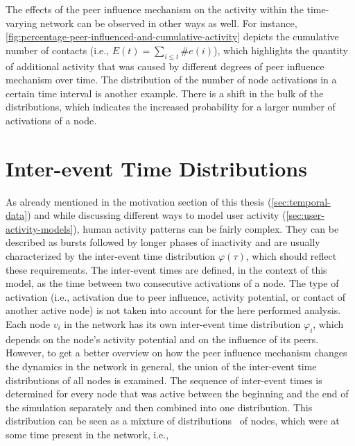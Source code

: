The effects of the peer influence mechanism on the activity within the time-varying network can be observed in other ways as well.
For instance, \cref{fig:percentage-peer-influenced-and-cumulative-activity} depicts the cumulative number of contacts (i.e., \( E(t) = \sum_{i \leq t} \#e(i) \)), which highlights the quantity of additional activity that was caused by different degrees of peer influence mechanism over time.
The distribution of the number of node activations in a certain time interval is another example.
There is a shift in the bulk of the distributions, which indicates the increased probability for a larger number of activations of a node.




\section{Inter-event Time Distributions}
\label{sec:inter-event-time-dists}

As already mentioned in the motivation section of this thesis (\cref{sec:temporal-data}) and while discussing different ways to model user activity (\cref{sec:user-activity-models}), human activity patterns can be fairly complex.
They can be described as bursts followed by longer phases of inactivity and are usually characterized by the inter-event time distribution \( \varphi(\tau) \), which should reflect these requirements.
The inter-event times are defined, in the context of this model, as the time between two consecutive activations of a node.
The type of activation (i.e., activation due to peer influence, activity potential, or contact of another active node) is not taken into account for the here performed analysis.
Each node \( v_{i} \) in the network has its own inter-event time distribution \( \varphi_{i} \), which depends on the node's activity potential and on the influence of its peers.
However, to get a better overview on how the peer influence mechanism changes the dynamics in the network in general, the union of the inter-event time distributions of all nodes is examined.
The sequence of inter-event times is determined for every node that was active between the beginning and the end of the simulation separately and then combined into one distribution.
This distribution can be seen as a mixture of distributions~\cite{Seidel2011} of nodes, which were at some time present in the network, i.e.,

